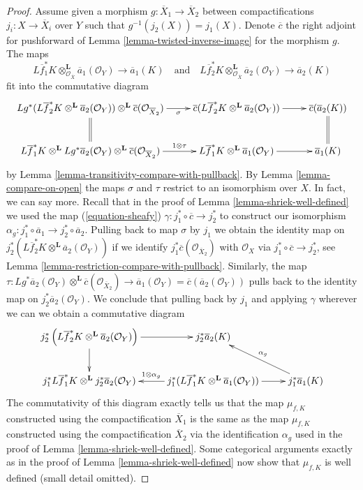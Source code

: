 \begin{proof}
\medskip\noindent
Assume given a morphism $g : \overline{X}_1 \to \overline{X}_2$
between compactifications $j_i : X \to \overline{X}_i$ over $Y$
such that $g^{-1}(j_2(X)) = j_1(X)$. Denote $\overline{c}$ the
right adjoint for pushforward of Lemma \ref{lemma-twisted-inverse-image}
for the morphism $g$. The maps
$$
L\overline{f}_1^*K \otimes_{\mathcal{O}_{\overline{X}}}^\mathbf{L}
\overline{a}_1(\mathcal{O}_Y)
\longrightarrow
\overline{a}_1(K)
\quad\text{and}\quad
L\overline{f}_2^*K \otimes_{\mathcal{O}_{\overline{X}}}^\mathbf{L}
\overline{a}_2(\mathcal{O}_Y)
\longrightarrow
\overline{a}_2(K)
$$
fit into the commutative diagram
$$
\xymatrix{
Lg^*(L\overline{f}_2^*K \otimes^\mathbf{L}
\overline{a}_2(\mathcal{O}_Y))
\otimes^\mathbf{L} \overline{c}(\mathcal{O}_{\overline{X}_2})
\ar@{=}[d] \ar[r]_-\sigma &
\overline{c}(L\overline{f}_2^*K \otimes^\mathbf{L}
\overline{a}_2(\mathcal{O}_Y)) \ar[r] &
\overline{c}(\overline{a}_2(K)) \ar@{=}[d] \\
L\overline{f}_1^*K \otimes^\mathbf{L} Lg^*\overline{a}_2(\mathcal{O}_Y)
\otimes^\mathbf{L} \overline{c}(\mathcal{O}_{\overline{X}_2})
\ar[r]^-{1 \otimes \tau} &
L\overline{f}_1^*K \otimes^\mathbf{L} \overline{a}_1(\mathcal{O}_Y) \ar[r] &
\overline{a}_1(K)
}
$$
by Lemma \ref{lemma-transitivity-compare-with-pullback}. By
Lemma \ref{lemma-compare-on-open} the maps $\sigma$ and $\tau$
restrict to an isomorphism over $X$. In fact, we can say more.
Recall that in the proof of Lemma \ref{lemma-shriek-well-defined} we used
the map (\ref{equation-sheafy}) $\gamma : j_1^* \circ \overline{c} \to j_2^*$
to construct our isomorphism
$\alpha_g : j_1^* \circ \overline{a}_1 \to j_2^* \circ \overline{a}_2$.
Pulling back to map $\sigma$ by $j_1$ we obtain the identity
map on $j_2^*\left(L\overline{f}_2^*K \otimes^\mathbf{L}
\overline{a}_2(\mathcal{O}_Y)\right)$ if we identify
$j_1^*\overline{c}(\mathcal{O}_{\overline{X}_2})$
with $\mathcal{O}_X$ via $j_1^* \circ \overline{c} \to j_2^*$, see
Lemma \ref{lemma-restriction-compare-with-pullback}.
Similarly, the map $\tau : Lg^*\overline{a}_2(\mathcal{O}_Y)
\otimes^\mathbf{L} \overline{c}(\mathcal{O}_{\overline{X}_2}) \to
\overline{a}_1(\mathcal{O}_Y) = \overline{c}(\overline{a}_2(\mathcal{O}_Y))$
pulls back to the identity map on $j_2^*\overline{a}_2(\mathcal{O}_Y)$.
We conclude that pulling back by $j_1$ and applying $\gamma$ wherever
we can we obtain a commutative diagram
$$
\xymatrix{
j_2^*\left(L\overline{f}_2^*K \otimes^\mathbf{L}
\overline{a}_2(\mathcal{O}_Y)\right) \ar[r] \ar[d] &
j_2^*\overline{a}_2(K) \\
j_1^*L\overline{f}_1^*K \otimes^\mathbf{L} j_2^*\overline{a}_2(\mathcal{O}_Y) &
j_1^*(L\overline{f}_1^*K \otimes^\mathbf{L} \overline{a}_1(\mathcal{O}_Y))
\ar[r] \ar[l]_{1 \otimes \alpha_g} &
j_1^* \overline{a}_1(K) \ar[lu]_{\alpha_g}
}
$$
The commutativity of this diagram exactly tells us that the map
$\mu_{f, K}$ constructed using the compactification $\overline{X}_1$
is the same as the map $\mu_{f, K}$ constructed using the compactification
$\overline{X}_2$ via the identification $\alpha_g$ used in the proof
of Lemma \ref{lemma-shriek-well-defined}. Some categorical arguments
exactly as in the proof of  Lemma \ref{lemma-shriek-well-defined}
now show that $\mu_{f, K}$ is well defined (small detail omitted).


\end{proof}
